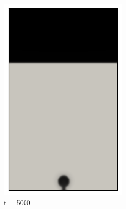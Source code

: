 \begin{figure}[H]
	\centering
	\begin{subfigure}{0.25\textwidth}
		\includegraphics[width=\linewidth]{figs/cap4/cuda_bb_760_s5}
		\caption{t = 5000}
		\label{fig:1}
	\end{subfigure}\hfil 
	\begin{subfigure}{0.25\textwidth}

\end{subfigure}
\end{figure}
